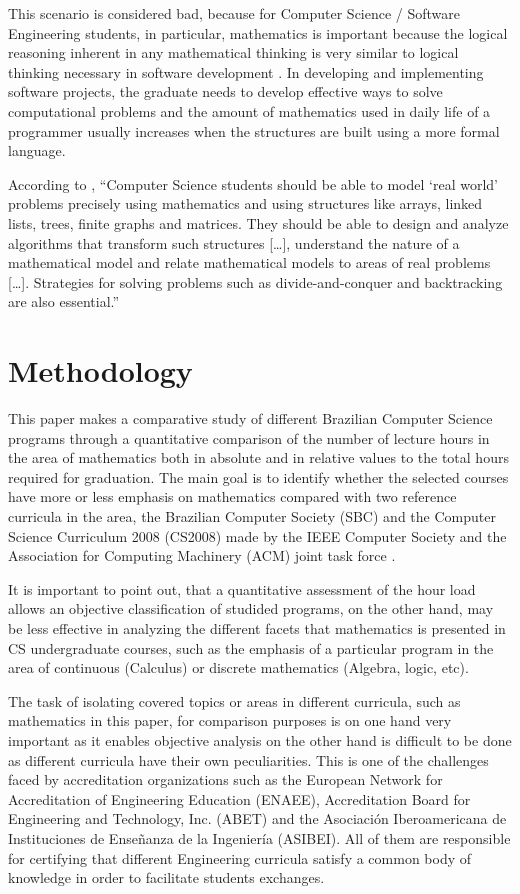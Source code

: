 \documentclass[conference]{IEEEtran}
\begin{document}
	This scenario is considered bad, because for Computer Science / Software Engineering students, in particular, mathematics is important because the logical reasoning inherent in any mathematical thinking is very similar to logical thinking necessary in software development \cite{ralston:do_need_mathematics}. In developing and implementing software projects, the graduate needs to develop effective ways to solve computational problems and the amount of mathematics used in daily life of a programmer usually increases when the structures are built using a more formal language. \cite{ralston:do_need_mathematics}

	According to \cite{kelemen:has_become_math_phobic}, ``Computer Science students should be able to model `real world' problems precisely using mathematics and using structures like arrays, linked lists, trees, finite graphs and matrices. They should be able to design and analyze algorithms that transform such structures [\ldots], understand the nature of a mathematical model and relate mathematical models to areas of real problems [\ldots]. Strategies for solving problems such as divide-and-conquer and backtracking are also essential.''

\section{Methodology}
	This paper makes a comparative study of different Brazilian Computer Science programs through a quantitative comparison of the number of lecture hours in the area of mathematics both in absolute and in relative values to the total hours required for graduation. The main goal is to identify whether the selected courses have more or less emphasis on mathematics compared with two reference curricula in the area, the Brazilian Computer Society (SBC) \cite{sbc} and the Computer Science Curriculum 2008 (CS2008) made by the IEEE Computer Society and the Association for Computing Machinery (ACM) joint task force \cite{cs2008}.

	It is important to point out, that a quantitative assessment of the hour load allows an objective classification of studided programs, on the other hand, may be less effective in analyzing the different facets that mathematics is presented in CS undergraduate courses, such as the emphasis of a particular program in the area of continuous (Calculus) or discrete mathematics (Algebra, logic, etc).

	The task of isolating covered topics or areas in different curricula, such as mathematics in this paper, for comparison purposes is on one hand very important as it enables objective analysis on the other hand is difficult to be done as different curricula have their own peculiarities. This is one of the challenges faced by accreditation organizations such as the European Network for Accreditation of Engineering Education (ENAEE), Accreditation Board for Engineering and Technology, Inc. (ABET) and the Asociación Iberoamericana de Instituciones de Enseñanza de la Ingeniería (ASIBEI). All of them are responsible for certifying that different Engineering curricula satisfy a common body of knowledge in order to facilitate students exchanges.
	
\end{document}
